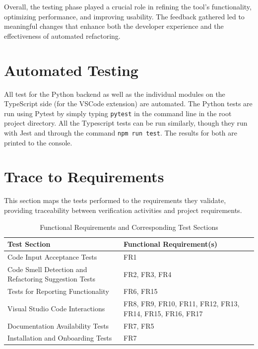 \documentclass[12pt, titlepage]{article}
\begin{document}
\bigskip
Overall, the testing phase played a crucial role in refining the
tool's functionality, optimizing performance, and improving
usability. The feedback gathered led to meaningful changes that
enhance both the developer experience and the effectiveness of
automated refactoring.

\section{Automated Testing}

All test for the Python backend as well as the individual modules on
the TypeScript side (for the VSCode extension) are automated. The
Python tests are run using Pytest by simply typing \texttt{pytest} in
the command line in the root project directory. All the Typescript
tests can be run similarly, though they run with Jest and through the
command \texttt{npm run test}. The results for both are printed to the console.

\section{Trace to Requirements}

This section maps the tests performed to the requirements they validate, providing traceability between verification activities and project requirements.

\begin{table}[H]
  \centering
  \caption{Functional Requirements and Corresponding Test Sections}
  \begin{tabular}{p{}p{}}
    \toprule \textbf{Test Section} & \textbf{Functional Requirement(s)} \\
    \midrule
    Code Input Acceptance Tests & FR1 \\
    Code Smell Detection and Refactoring Suggestion Tests & FR2, FR3, FR4 \\
    Tests for Reporting Functionality & FR6, FR15 \\
    Visual Studio Code Interactions & FR8, FR9, FR10, FR11, FR12, FR13, FR14, FR15, FR16, FR17 \\
    Documentation Availability Tests & FR7, FR5 \\
    Installation and Onboarding Tests & FR7 \\
    \bottomrule
  \end{tabular}
  \label{tab:sections_requirements}
\end{table}
\end{document}
